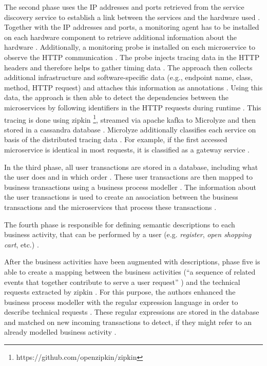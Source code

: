 The second phase uses the IP addresses and ports retrieved from the service discovery service to establish a link between the services and the hardware used \cite{Kleehaus2018}.
Together with the IP addresses and ports, a monitoring agent has to be installed on each hardware component to retrieve additional information about the hardware \cite{Kleehaus2018}.
Additionally, a monitoring probe is installed on each microservice to observe the HTTP communication \cite{Kleehaus2018}.
The probe injects tracing data in the HTTP headers and therefore helps to gather timing data \cite{Kleehaus2018}.
The approach then collects additional infrastructure and software-specific data (e.g., endpoint name, class, method, HTTP request) and attaches this information as annotations \cite{Kleehaus2018}.
Using this data, the approach is then able to detect the dependencies between the microservices by following identifiers in the HTTP requests during runtime \cite{Kleehaus2018}.
This tracing is done using zipkin \footnote{https://github.com/openzipkin/zipkin}, streamed via apache kafka to Microlyze and then stored in a cassandra database \cite{Kleehaus2018}.
Microlyze additionally classifies each service on basis of the distributed tracing data \cite{Kleehaus2018}.
For example, if the first accessed microservice is identical in most requests, it is classified as a gateway service \cite{Kleehaus2018}.

In the third phase, all user transactions are stored in a database, including what the user does and in which order \cite{Kleehaus2018}.
These user transactions are then mapped to business transactions using a business process modeller \cite{Kleehaus2018}.
The information about the user transactions is used to create an association between the business transactions and the microservices that process these transactions \cite{Kleehaus2018}.

The fourth phase is responsible for defining semantic descriptions to each business activity, that can be performed by a user (e.g. \textit{register}, \textit{open shopping cart}, etc.) \cite{Kleehaus2018}.

After the business activities have been augmented with descriptions, phase five is able to create a mapping between the business activities (``a sequence of related events that together contribute to serve a user request'' \cite{Kleehaus2018}) and the technical requests extracted by zipkin \cite{Kleehaus2018}.
For this purpose, the authors enhanced the business process modeller with the regular expression language in order to describe technical requests \cite{Kleehaus2018}.
These regular expressions are stored in the database and matched on new incoming transactions to detect, if they might refer to an already modelled business activity \cite{Kleehaus2018}.

